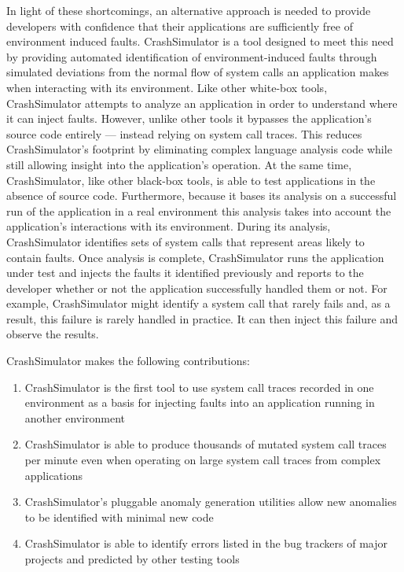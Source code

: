     In light of these shortcomings, an alternative approach is needed to provide developers with confidence that their
    applications are sufficiently free of environment induced faults.  CrashSimulator is a tool designed to meet this
    need by providing automated identification of environment-induced faults through simulated deviations from the
    normal flow of system calls an application makes when interacting with its environment. Like other white-box tools,
    CrashSimulator attempts to analyze an application in order to understand where it can inject faults.  However,
    unlike other tools it bypasses the application's source code entirely --- instead relying on system call traces.
    This reduces CrashSimulator's footprint by eliminating complex language analysis code while still allowing insight
    into the application's operation. At the same time, CrashSimulator, like other black-box tools, is able to test
    applications in the absence of source code. Furthermore, because it bases its analysis on a successful run of the
    application in a real environment this analysis takes into account the application's interactions with its
    environment. During its analysis, CrashSimulator identifies sets of system calls that represent areas likely to
    contain faults. Once analysis is complete, CrashSimulator runs the application under test and injects the faults it
    identified previously and reports to the developer whether or not the application successfully handled them or not.
    For example, CrashSimulator might identify a system call that rarely fails and, as a result, this failure is rarely
    handled in practice. It can then inject this failure and observe the results.

    CrashSimulator makes the following contributions:

    \begin{enumerate}
        \item{CrashSimulator is the first tool to use system call traces recorded in one environment as a basis for
            injecting faults into an application running in another environment}
        \item{CrashSimulator is able to produce thousands of mutated system call traces per minute even when operating
            on large system call traces from complex applications}
        \item{CrashSimulator's pluggable anomaly generation utilities allow new anomalies to be identified with minimal
            new code}
        \item{CrashSimulator is able to identify errors listed in the bug trackers of major projects and predicted by
            other testing tools}
    \end{enumerate}
